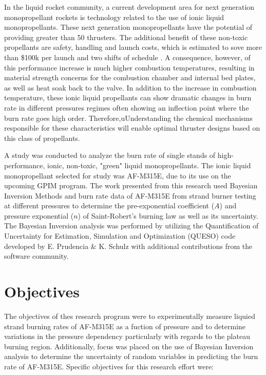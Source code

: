 \documentclass{article}
\begin{document}
In the liquid rocket community, a current development area for next generation monopropellant rockets is technology
related to the use of ionic liquid monopropellants. These next generation monopropellants have the potential of
providing greater than 50%
thrusters. The additional benefit of these non-toxic propellants are safety, handling and launch costs, which is 
estimated to sove more than \$100k per launch and two shifts of schedule \citep{sporesGPIM}. A consequence, however,
of this performance increase is much higher combustion temperatures, resulting in material strength concerns for the
combustion chamber and internal bed plates, as well as heat soak back to the valve. In addition to the increase in
combustion temperature, these ionic liquid propellants can show dramatic changes in burn rate in different pressures
regimes often showing an inflection point where the burn rate goes high order. Therefore,uUnderstanding the chemical
mechanisms responsible for these characteristics will enable optimal thruster designs based on this class of propellants.

A study was conducted to analyze the burn rate of single stands of high-performance, ionic, non-toxic, "green" liquid
monopropellants. The ionic liquid monopropellant selected for study was AF-M315E, due to its use on the upcoming GPIM
program\citep{sporesGPIM}. The work presented from this research used Bayesian Inversion Methods and burn rate data of
AF-M315E from strand burner testing at different pressures to determine the pre-exponential coefficient ($A$) and 
pressure exponential ($n$) of Saint-Robert's burning law as well as its uncertainty. The Bayesian Inversion analysis
was performed by utilizing the Quantification of Uncertainty for Estimation, Simulation and Optimization (QUESO) code
developed by E. Prudencia \& K. Schulz with additional contributions from the software community\citep{prudencio2012}.

\section{Objectives} \label{objectives}

The objectives of thes research program were to experimentally measure liquied strand burning rates of AF-M315E as a
fuction of pressure and to determine variations in the pressure dependency particularly with regards to the plateau
burning region. Additionally, focus was placed on the use of Bayesian Inversion analysis to determine the uncertainty
of random variables in predicting the burn rate of AF-M315E. Specific objectives for this research effort were:
\end{document}
